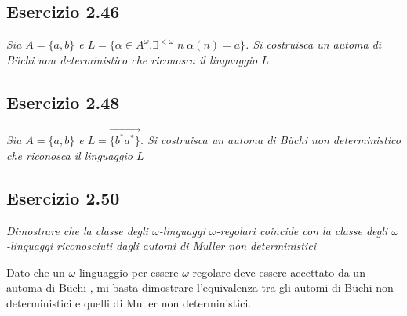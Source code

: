 \documentclass[12pt]{article}
\newcommand{\buchi}{B\"uchi }
\begin{document}
\subsection*{Esercizio 2.46}
\textit{Sia $A=\{a,b\}$ e $L=\{\alpha \in A^\omega. \exists^{<\omega}\;n\;\alpha(n)=a\}$. Si costruisca un automa di \buchi non deterministico che riconosca il linguaggio $L$}
 
\begin{center}
\end{center}


\subsection*{Esercizio 2.48}
\textit{Sia $A=\{a,b\}$ e $L=\overrightarrow{\{b^*a^*\}}$. Si costruisca un automa di \buchi non deterministico che riconosca il linguaggio $L$}

\begin{center}
\end{center}


\subsection*{Esercizio 2.50}
\textit{Dimostrare che la classe degli $\omega$-linguaggi $\omega$-regolari coincide con la classe degli $\omega$-linguaggi riconosciuti dagli automi di Muller non deterministici}

Dato che un $\omega$-linguaggio per essere $\omega$-regolare deve essere accettato da un automa di \buchi, mi basta dimostrare l'equivalenza tra gli automi di \buchi non deterministici e quelli di Muller non deterministici.
\end{document}
